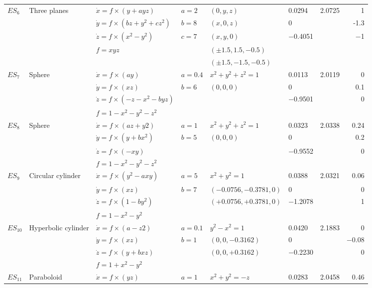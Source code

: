 \begin{table}[htbp]
\begin{tabular}{llllllrr}
\hline
\(ES_6\) & Three planes & \(\dot{x} = f\times(y + ayz)\) & \(a = 2\) & \((0, y, z)\) & 0.0294 & 2.0725 & 1\\
 &  & \(\dot{y} = f\times(bz + y^2 + cz^2)\) & \(b = 8\) & \((x, 0, z)\) & 0 &  & -1.3\\
 &  & \(\dot{z} = f\times(x^2 − y^2)\) & \(c = 7\) & \((x, y, 0)\) & −0.4051 &  & −1\\
 &  & \(f = xyz\) &  & \((\pm{}1.5, 1.5, −0.5)\) &  &  & \\
 &  &  &  & \((\pm{}1.5, −1.5, −0.5)\) &  &  & \\
\hline
\(ES_7\) & Sphere & \(\dot{x} = f\times(ay)\) & \(a = 0.4\) & \(x^2 + y^2 + z^2  = 1\) & 0.0113 & 2.0119 & 0\\
 &  & \(\dot{y} = f\times(xz)\) & \(b = 6\) & \((0, 0, 0)\) & 0 &  & 0.1\\
 &  & \(\dot{z} = f\times(-z − x^2 − byz)\) &  &  & −0.9501 &  & 0\\
 &  & \(f = 1 − x^2 − y^2 − z^2\) &  &  &  &  & \\
\hline
\(ES_8\) & Sphere & \(\dot{x} = f\times(az + y2)\) & \(a = 1\) & \(x^2 + y^2 + z^2  = 1\) & 0.0323 & 2.0338 & 0.24\\
 &  & \(\dot{y} = f\times(y + bx^2)\) & \(b = 5\) & \((0, 0, 0)\) & 0 &  & 0.2\\
 &  & \(\dot{z} = f\times(−xy)\) &  &  & −0.9552 &  & 0\\
 &  & \(f = 1 − x^2 − y^2 − z^2\) &  &  &  &  & \\
\hline
\(ES_9\) & Circular cylinder & \(\dot{x} = f\times(y^2 − axy)\) & \(a = 5\) & \(x^2 + y^2 = 1\) & 0.0388 & 2.0321 & 0.06\\
 &  & \(\dot{y} = f\times(xz)\) & \(b = 7\) & \((−0.0756,−0.3781, 0)\) & 0 &  & 0\\
 &  & \(\dot{z} = f\times(1 − by^2)\) &  & \((+0.0756,+0.3781, 0)\) & −1.2078 &  & 1\\
 &  & \(f = 1 − x^2 − y^2\) &  &  &  &  & \\
\hline
$ES_{10}$ & Hyperbolic cylinder & \(\dot{x} = f\times(a − z2)\) & \(a = 0.1\) & \(y^2 − x^2 = 1\) & 0.0420 & 2.1883 & 0\\
 &  & \(\dot{y} = f\times(xz)\) & \(b = 1\) & \((0, 0,−0.3162)\) & 0 &  & −0.08\\
 &  & \(\dot{z} = f\times(y + bxz)\) &  & \((0, 0,+0.3162)\) & −0.2230 &  & 0\\
 &  & \(f = 1 + x^2 − y^2\) &  &  &  &  & \\
\hline
\(ES_{11}\) & Paraboloid & \(\dot{x} = f\times(yz)\) & \(a = 1\) & \(x^2 + y^2 = −z\) & 0.0283 & 2.0458 & 0.46\\

\end{tabular}
\end{table}

